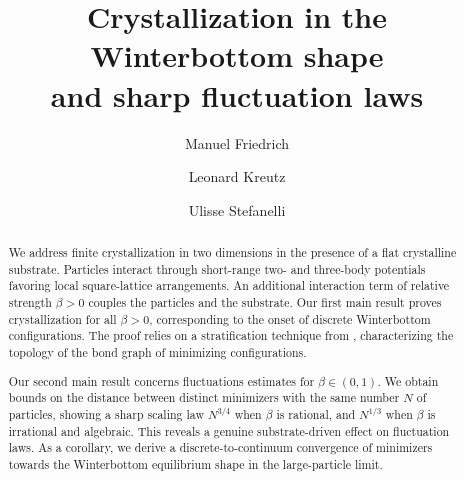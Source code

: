 \documentclass[reqno]{amsart}
\theoremstyle{plain}
\theoremstyle{definition}
\numberwithin{equation}{section}
\begin{document}
\title[Crystallization in the Winterbottom shape and sharp fluctuation laws]{Crystallization in the Winterbottom shape\\ and sharp fluctuation laws}



\author[M. Friedrich]{Manuel Friedrich} 
\address[Manuel Friedrich]{Department of Mathematics, Friedrich-Alexander Universit\"at Erlangen-N\"urnberg. Cauerstr.~11,
D-91058 Erlangen, Germany}




\author[L.~Kreutz]{Leonard Kreutz}
\address[Leonard Kreutz]{Zentrum Mathematik - M7, Technische Universit\"at M\"unchen,  Boltzmannstr. 3
D-85748 Garching b. M\"unchen,  Germany}
  
\author[U.~Stefanelli]{Ulisse Stefanelli}
\address[Ulisse Stefanelli]{Faculty of Mathematics, University of
  Vienna, Oskar-Morgenstern-Platz 1, A-1090 Vienna, Austria, \& Vienna
  Research Platform on Accelerating Photoreaction Discovery,
  University of Vienna, Wahringerstraße 17, 1090 Wien, Austria.}
 

 

   
\begin{abstract} 
We address finite crystallization in two dimensions in the presence of
a flat crystalline substrate. Particles interact through short-range two-
and three-body potentials favoring local square-lattice
arrangements. An additional interaction term of relative strength $\beta>0$ couples
the particles and the substrate. Our first main result proves
crystallization for all $\beta>0$, corresponding to
 the onset of discrete Winterbottom configurations. 
The
proof relies on a stratification technique from
\cite{FriedrichKreutz}, characterizing the topology of the bond graph
of minimizing configurations.

Our second main result concerns
fluctuations estimates for $\beta\in (0,1)$. We obtain bounds on
the distance between distinct minimizers with the same number $N$ of
particles, showing a sharp scaling law
$N^{3/4}$ when $\beta$ is rational,  and $N^{1/3}$ 
when $\beta$ is irrational and algebraic. This reveals a genuine
substrate-driven effect on fluctuation laws. As a corollary, we derive
a discrete-to-continuum convergence of minimizers towards the
Winterbottom equilibrium shape in the large-particle limit.  
\end{abstract}
\end{document}
